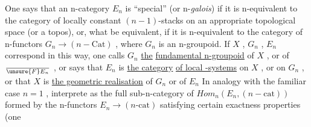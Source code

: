 One says that an n-category $E_n$ is ``special'' (or n-\textit{galois}) if it is
n-equivalent to the category of locally constant $(n-1)$-stacks on an appropriate
topological space (or a topos), or, what  be equivalent, if it is
n-equivalent to the category of n-functors $G_n \to (n - \mathrm{Cat})$ , where $G_n$ is
an n-groupoid. If $X$ , $G_n$ , $E_n$ correspond in this way, one calls $G_n$ \uline{the}
\uline{fundamental n-groupoid} of $X$ , or of $\over{\unsure{F}}{E}_n$ , or says that $E_n$ is \uline{the category}
\uline{of local -systems} on $X$ , or on $G_n$ , or that $X$ is \uline{the geometric realisation}
\margin{/} of $G_n$ or of $E_n$  In analogy with the familiar case $n = 1$ ,  
 interprete  as the full sub-n-category of $\mathit{Hom}_n(E_n , (n - \mathrm{cat}))$ formed by
the n-functors $E_n \to (n\text{-}\mathrm{cat})$ satisfying certain exactness properties (one

